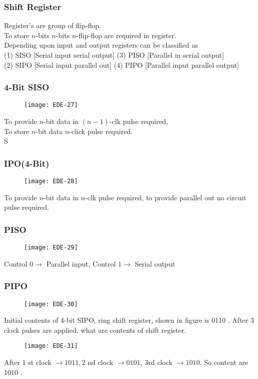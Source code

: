 \begin{enumerate}
\subsubsection{Shift Register}
Register's are group of flip-flop.\\
To store $n$-bits $n$-bits $n$-flip-flop are required in register. \\
Depending upon input and output registers can be classified as\\
(1) SISO [Serial input serial output]\quad
(3) PISO [Parallel in serial output]\\
(2) SIPO [Serial input parallel out]\quad
(4) PIPO [Parallel input parallel output]\\
\subsubsection{ 4-Bit SISO}
\begin{figure}[H]
	\centering
	\texttt{[image: EDE-27]}
\end{figure}
To provide $n$-bit data in $(n-1)$-clk pulse required, \\
To store $n$-bit data $n$-click pulse required.\\
S\subsubsection{IPO(4-Bit)}
\begin{figure}[H]
	\centering
	\texttt{[image: EDE-28]}
\end{figure}
To provide $n$-bit data in $n$-clk pulse required, to provide parallel out no circuit pulse required.\\
\subsubsection{ PISO }
\begin{figure}[H]
	\centering
	\texttt{[image: EDE-29]}
\end{figure}
Control $0 \rightarrow$ Parallel input, Control $1 \rightarrow$ Serial output\\
\subsubsection{ PIPO}
\begin{figure}[H]
	\centering
	\texttt{[image: EDE-30]}
\end{figure}
 Initial contents of 4-bit SIPO, ring shift register, shown in figure is 0110 . After 3 clock pulses are applied, what are contents of shift register.
\begin{figure}[H]
	\centering
	\texttt{[image: EDE-31]}
\end{figure}
\begin{answer}
	After 1 st clock $\rightarrow 1011,2$ nd clock $\rightarrow 0101$, 3rd clock $\rightarrow 1010$. So content are 1010 .
\end{answer}

\end{enumerate}
